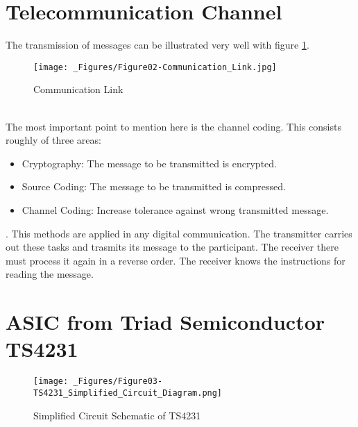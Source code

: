 \documentclass[a4paper,twoside, openright,12pt]{report}
\begin{document}
\section{Telecommunication Channel}
\label{Section_Telecommunication-Channel}
The transmission of messages can be illustrated very well with figure \ref{Communication-Link}.
\begin{figure}[h]
\begin{center}
\texttt{[image: \_Figures/Figure02-Communication\_Link.jpg]}
\caption{Communication Link \cite{Hagenauer.20170420}}
\label{Communication-Link}
\end{center}
\end{figure} \\
The most important point to mention here is the channel coding. This consists roughly of three areas:
\begin{itemize}
\item Cryptography: The message to be transmitted is encrypted.
\item Source Coding: The message to be transmitted is compressed.
\item Channel Coding: Increase tolerance against wrong transmitted message.
\end{itemize} \cite{Bossert.2013}.
This methods are applied in any digital communication. The transmitter carries out these tasks and trasmits its message to the participant. The receiver there must process it again in a reverse order. The receiver knows the instructions for reading the message. \cite{Hagenauer.20170420} \cite{Bossert.2013}


\section{ASIC from Triad Semiconductor TS4231}
\label{Section_TS4231}
\begin{figure}[h]
\begin{center}
\texttt{[image: \_Figures/Figure03-TS4231\_Simplified\_Circuit\_Diagram.png]}
\caption{Simplified Circuit Schematic of TS4231 \cite{TriadSemiconductor.2016b}}
\label{Schematic_TS4231}
\end{center}
\end{figure}
\end{document}
